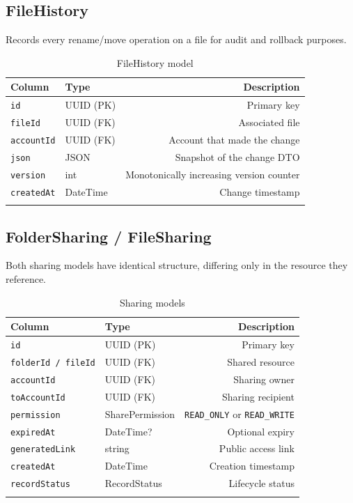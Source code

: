 \documentclass[12pt,a4paper]{article}
\begin{document}
\subsection{FileHistory}

Records every rename/move operation on a file for audit and rollback purposes.

\begin{longtable}{llD}
\toprule
\textbf{Column} & \textbf{Type} & \textbf{Description} \\
\midrule
\texttt{id}        & UUID (PK) & Primary key \\
\texttt{fileId}    & UUID (FK) & Associated file \\
\texttt{accountId} & UUID (FK) & Account that made the change \\
\texttt{json}      & JSON      & Snapshot of the change DTO \\
\texttt{version}   & int       & Monotonically increasing version counter \\
\texttt{createdAt} & DateTime  & Change timestamp \\
\bottomrule
\caption{FileHistory model}
\end{longtable}

\subsection{FolderSharing / FileSharing}

Both sharing models have identical structure, differing only in the resource they reference.

\begin{longtable}{llD}
\toprule
\textbf{Column} & \textbf{Type} & \textbf{Description} \\
\midrule
\texttt{id}            & UUID (PK)       & Primary key \\
\texttt{folderId / fileId} & UUID (FK)   & Shared resource \\
\texttt{accountId}     & UUID (FK)       & Sharing owner \\
\texttt{toAccountId}   & UUID (FK)       & Sharing recipient \\
\texttt{permission}    & SharePermission & \texttt{READ\_ONLY} or \texttt{READ\_WRITE} \\
\texttt{expiredAt}     & DateTime?       & Optional expiry \\
\texttt{generatedLink} & string          & Public access link \\
\texttt{createdAt}     & DateTime        & Creation timestamp \\
\texttt{recordStatus}  & RecordStatus    & Lifecycle status \\
\bottomrule
\caption{Sharing models}
\end{longtable}
\end{document}
